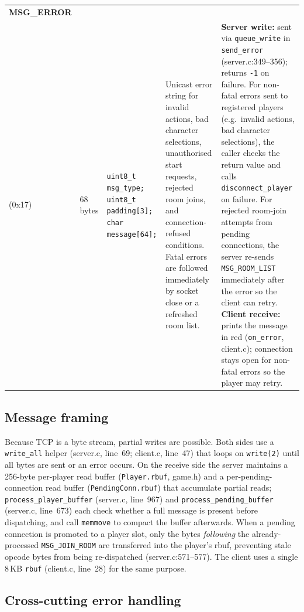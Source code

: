 \documentclass[11pt,letterpaper]{article}
\begin{document}
\begin{longtable}{@{}p{1.8cm} p{1.2cm} p{2.4cm} p{4.2cm} p{4.8cm}@{}}
\textbf{MSG\_ERROR}\\(0x17) &
68 bytes &
\texttt{uint8\_t msg\_type;}\newline
\texttt{uint8\_t padding[3];}\newline
\texttt{char message[64];} &
Unicast error string for invalid actions, bad character selections, unauthorised start requests, rejected room joins, and connection-refused conditions. Fatal errors are followed immediately by socket close or a refreshed room list. &
\textbf{Server write:} sent via \texttt{queue\_write} in \texttt{send\_error} (server.c:349--356); returns \texttt{-1} on failure. For non-fatal errors sent to registered players (e.g.\ invalid actions, bad character selections), the caller checks the return value and calls \texttt{disconnect\_player} on failure. For rejected room-join attempts from pending connections, the server re-sends \texttt{MSG\_ROOM\_LIST} immediately after the error so the client can retry. \textbf{Client receive:} prints the message in red (\texttt{on\_error}, client.c); connection stays open for non-fatal errors so the player may retry. \\
\bottomrule
\end{longtable}
\endgroup

\subsection*{Message framing}

Because TCP is a byte stream, partial writes are possible. Both sides use a \texttt{write\_all} helper (server.c, line~69; client.c, line~47) that loops on \texttt{write(2)} until all bytes are sent or an error occurs. On the receive side the server maintains a 256-byte per-player read buffer (\texttt{Player.rbuf}, game.h) and a per-pending-connection read buffer (\texttt{PendingConn.rbuf}) that accumulate partial reads; \texttt{process\_player\_buffer} (server.c, line~967) and \texttt{process\_pending\_buffer} (server.c, line~673) each check whether a full message is present before dispatching, and call \texttt{memmove} to compact the buffer afterwards. When a pending connection is promoted to a player slot, only the bytes \emph{following} the already-processed \texttt{MSG\_JOIN\_ROOM} are transferred into the player's rbuf, preventing stale opcode bytes from being re-dispatched (server.c:571--577). The client uses a single 8\,KB \texttt{rbuf} (client.c, line~28) for the same purpose.

\subsection*{Cross-cutting error handling}
\end{document}
